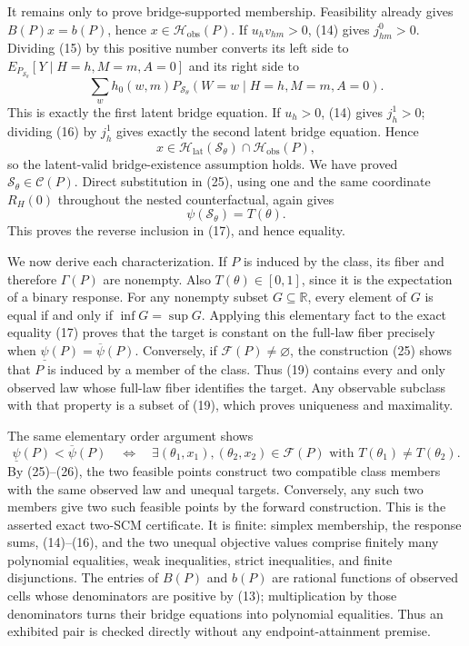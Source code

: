 It remains only to prove bridge-supported membership.  Feasibility already
gives \(B(P)x=b(P)\), hence
\(x\in\mathcal H_{\mathrm{obs}}(P)\).  If \(u_hv_{hm}>0\), (14) gives
\(j^0_{hm}>0\).  Dividing (15) by this positive number converts its left side
to
\(E_{P_{\mathcal S_\theta}}[Y\mid H=h,M=m,A=0]\) and its right side to
\[
 \sum_w h_0(w,m)
 P_{\mathcal S_\theta}(W=w\mid H=h,M=m,A=0).
\]
This is exactly the first latent bridge equation.  If \(u_h>0\), (14) gives
\(j^1_h>0\); dividing (16) by \(j^1_h\) gives exactly the second latent
bridge equation.  Hence
\[
 x\in\mathcal H_{\mathrm{lat}}(\mathcal S_\theta)
      \cap\mathcal H_{\mathrm{obs}}(P),
\]
so the latent-valid bridge-existence assumption holds.  We have proved
\(\mathcal S_\theta\in\mathcal C(P)\).  Direct substitution in (25), using
one and the same coordinate \(R_H(0)\) throughout the nested counterfactual,
again gives
\[
 \psi(\mathcal S_\theta)=T(\theta).
 \tag{26}
\]
This proves the reverse inclusion in (17), and hence equality.

We now derive each characterization.  If \(P\) is induced by the class, its
fiber and therefore \(\Gamma(P)\) are nonempty.  Also
\(T(\theta)\in[0,1]\), since it is the expectation of a binary response.
For any nonempty subset \(G\subseteq\mathbb R\), every element of \(G\) is
equal if and only if \(\inf G=\sup G\).  Applying this elementary fact to
the exact equality (17) proves that the target is constant on the full-law
fiber precisely when
\(\underline\psi(P)=\overline\psi(P)\).  Conversely, if
\(\mathcal F(P)\ne\varnothing\), the construction (25) shows that \(P\) is
induced by a member of the class.  Thus (19) contains every and only observed
law whose full-law fiber identifies the target.  Any observable subclass with
that property is a subset of (19), which proves uniqueness and maximality.

The same elementary order argument shows
\[
 \underline\psi(P)<\overline\psi(P)
 \quad\Longleftrightarrow\quad
 \exists (\theta_1,x_1),(\theta_2,x_2)\in\mathcal F(P)
 \text{ with }T(\theta_1)\ne T(\theta_2).
\]
By (25)--(26), the two feasible points construct two compatible class members
with the same observed law and unequal targets.  Conversely, any such two
members give two such feasible points by the forward construction.  This is
the asserted exact two-SCM certificate.  It is finite: simplex membership,
the response sums, (14)--(16), and the two unequal objective values comprise
finitely many polynomial equalities, weak inequalities, strict inequalities,
and finite disjunctions.  The entries of \(B(P)\) and \(b(P)\) are rational
functions of observed cells whose denominators are positive by (13);
multiplication by those denominators turns their bridge equations into
polynomial equalities.  Thus an exhibited pair is checked directly without
any endpoint-attainment premise.

